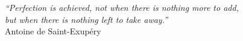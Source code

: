 \cleardoublepage
\thispagestyle{plain}

\vspace*{8cm}

\begin{flushright}
   \textsl{``Perfection is achieved, not when there is nothing more to add, \\
           but when there is nothing left to take away.''} \\
\vspace*{1.5cm}
           Antoine de Saint-Exupéry
\end{flushright}
